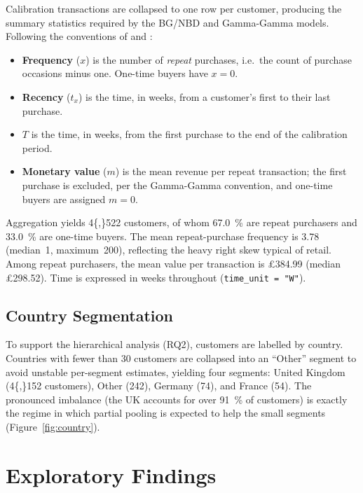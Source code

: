 Calibration transactions are collapsed to one row per customer, producing the summary statistics required by the BG/NBD and Gamma-Gamma models. Following the conventions of \textcite{fader2005} and \textcite{fader2013}:

\begin{itemize}
  \item \textbf{Frequency} ($x$) is the number of \emph{repeat} purchases, i.e.\ the count of purchase occasions minus one. One-time buyers have $x = 0$.
  \item \textbf{Recency} ($t_x$) is the time, in weeks, from a customer's first to their last purchase.
  \item \textbf{$T$} is the time, in weeks, from the first purchase to the end of the calibration period.
  \item \textbf{Monetary value} ($m$) is the mean revenue per repeat transaction; the first purchase is excluded, per the Gamma-Gamma convention, and one-time buyers are assigned $m = 0$.
\end{itemize}

Aggregation yields \num{4{,}522} customers, of whom \SI{67.0}{\percent} are repeat purchasers and \SI{33.0}{\percent} are one-time buyers. The mean repeat-purchase frequency is \num{3.78} (median~1, maximum~200), reflecting the heavy right skew typical of retail. Among repeat purchasers, the mean value per transaction is \pounds\num{384.99} (median \pounds\num{298.52}). Time is expressed in weeks throughout (\texttt{time\_unit~=~"W"}).

\subsection{Country Segmentation}
\label{sec:segmentation}

To support the hierarchical analysis (RQ2), customers are labelled by country. Countries with fewer than \num{30} customers are collapsed into an ``Other'' segment to avoid unstable per-segment estimates, yielding four segments: United Kingdom (\num{4{,}152} customers), Other (\num{242}), Germany (\num{74}), and France (\num{54}). The pronounced imbalance (the UK accounts for over \SI{91}{\percent} of customers) is exactly the regime in which partial pooling is expected to help the small segments (Figure~\ref{fig:country}).

\section{Exploratory Findings}
\label{sec:eda}

